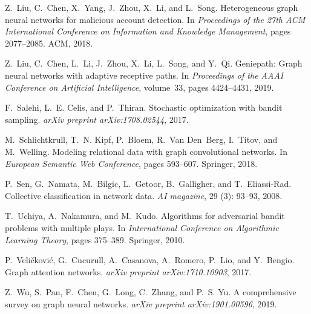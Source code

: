 \documentclass{article}
\begin{document}
\begin{thebibliography}{25}
Z.~Liu, C.~Chen, X.~Yang, J.~Zhou, X.~Li, and L.~Song.
\newblock Heterogeneous graph neural networks for malicious account detection.
\newblock In \emph{Proceedings of the 27th ACM International Conference on
  Information and Knowledge Management}, pages 2077--2085. ACM, 2018.

Z.~Liu, C.~Chen, L.~Li, J.~Zhou, X.~Li, L.~Song, and Y.~Qi.
\newblock Geniepath: Graph neural networks with adaptive receptive paths.
\newblock In \emph{Proceedings of the AAAI Conference on Artificial
  Intelligence}, volume~33, pages 4424--4431, 2019.

F.~Salehi, L.~E. Celis, and P.~Thiran.
\newblock Stochastic optimization with bandit sampling.
\newblock \emph{arXiv preprint arXiv:1708.02544}, 2017.

M.~Schlichtkrull, T.~N. Kipf, P.~Bloem, R.~Van Den~Berg, I.~Titov, and
  M.~Welling.
\newblock Modeling relational data with graph convolutional networks.
\newblock In \emph{European Semantic Web Conference}, pages 593--607. Springer,
  2018.

P.~Sen, G.~Namata, M.~Bilgic, L.~Getoor, B.~Galligher, and T.~Eliassi-Rad.
\newblock Collective classification in network data.
\newblock \emph{AI magazine}, 29 (3): 93--93, 2008.

T.~Uchiya, A.~Nakamura, and M.~Kudo.
\newblock Algorithms for adversarial bandit problems with multiple plays.
\newblock In \emph{International Conference on Algorithmic Learning Theory},
  pages 375--389. Springer, 2010.

P.~Veli{\v{c}}kovi{\'c}, G.~Cucurull, A.~Casanova, A.~Romero, P.~Lio, and
  Y.~Bengio.
\newblock Graph attention networks.
\newblock \emph{arXiv preprint arXiv:1710.10903}, 2017.

Z.~Wu, S.~Pan, F.~Chen, G.~Long, C.~Zhang, and P.~S. Yu.
\newblock A comprehensive survey on graph neural networks.
\newblock \emph{arXiv preprint arXiv:1901.00596}, 2019.


\end{thebibliography}
\end{document}

